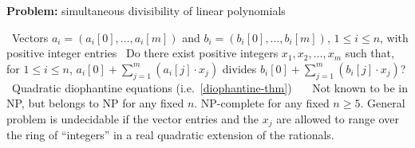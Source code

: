 \documentclass{amsart}
\theoremstyle{plain}
\begin{document}
\begin{algorithm}[h]
  \caption*{\textbf{Problem:} simultaneous divisibility of linear polynomials}
  \begin{algorithmic}[1]
    \Require\, Vectors $a_i=(a_i[0],\ldots,a_i[m])$ and $b_i=(b_i[0],\ldots,b_i[m])$, $1\leq i\leq
    n$, with positive integer entries
    \Description\, Do there exist positive integers $x_1,x_2,\ldots,x_m$ such that, for $1\leq
    i\leq n$, $a_i[0]+\sum_{j=1}^m(a_i[j]\cdot x_j)$ divides $b_i[0]+\sum_{j=1}^m(b_i[j]\cdot
    x_j)$?
    \Reduction\, Quadratic diophantine equations (i.e.\ \autoref{diophantine-thm})
    \Reference\,~\cite{lipshitz-77,lipshitz-78}
    \Commentx\, Not known to be in NP, but belongs to NP for any fixed $n$. NP-complete for any
    fixed $n\geq 5$. General problem is undecidable if the vector entries and the $x_j$ are allowed
    to range over the ring of ``integers'' in a real quadratic extension of the rationals.
  \end{algorithmic}
\end{algorithm}

\newpage

\printbibliography[]
\end{document}
